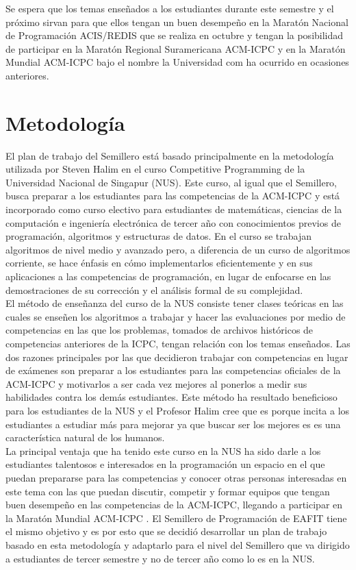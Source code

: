 \documentclass[conference]{IEEEtran}
\begin{document}
Se espera que los temas enseñados a los estudiantes durante este semestre y el próximo sirvan para que ellos tengan un buen desempeño en la Maratón Nacional de Programación ACIS/REDIS que se realiza en octubre y tengan la posibilidad de participar en la Maratón Regional Suramericana ACM-ICPC y en la Maratón Mundial ACM-ICPC bajo el nombre la Universidad com ha ocurrido en ocasiones anteriores.

\section{Metodología}
El plan de trabajo del Semillero está basado principalmente en la metodología utilizada por Steven Halim en el curso Competitive Programming de la Universidad Nacional de Singapur (NUS). Este curso, al igual que el Semillero, busca preparar a los estudiantes para las competencias de la ACM-ICPC y está incorporado como curso electivo para estudiantes de matemáticas, ciencias de la computación e ingeniería electrónica de tercer año con conocimientos previos de programación, algoritmos y estructuras de datos. En el curso se trabajan algoritmos de nivel medio y avanzado pero, a diferencia de un curso de algoritmos corriente, se hace énfasis en cómo implementarlos eficientemente y en sus aplicaciones a las competencias de programación, en lugar de enfocarse en las demostraciones de su corrección y el análisis formal de su complejidad\cite{PaperHalim}.\\
El método de enseñanza del curso de la NUS consiste tener clases teóricas en las cuales se enseñen los algoritmos a trabajar y hacer las evaluaciones por medio de competencias en las que los problemas, tomados de archivos históricos de competencias anteriores de la ICPC, tengan relación con los temas enseñados. Las dos razones principales por las que decidieron trabajar con competencias en lugar de exámenes son preparar a los estudiantes para las competencias oficiales de la ACM-ICPC y motivarlos a ser cada vez mejores al ponerlos a medir sus habilidades contra los demás estudiantes. Este método ha resultado beneficioso para los estudiantes de la NUS y el Profesor Halim cree que es porque incita a los estudiantes a estudiar más para mejorar ya que buscar ser los mejores es es una característica natural de los humanos.\\
La principal ventaja que ha tenido este curso en la NUS ha sido darle a los estudiantes talentosos e interesados en la programación un espacio en el que puedan prepararse para las competencias y conocer otras personas interesadas en este tema con las que puedan discutir, competir y formar equipos que tengan buen desempeño en las competencias de la ACM-ICPC, llegando a participar en la Maratón Mundial ACM-ICPC \cite{AlgoNUS}. El Semillero de Programación de EAFIT tiene el mismo objetivo y es por esto que se decidió desarrollar un plan de trabajo basado en esta metodología y adaptarlo para el nivel del Semillero que va dirigido a estudiantes de tercer semestre y no de tercer año como lo es en la NUS.
\end{document}
